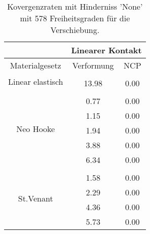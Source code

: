 \begin{table} 
\centering 
\begin{tabular}{c|cc|} 
\cline{2-3} 
 & \multicolumn{2}{|c|}{Linearer Kontakt} \\ 
\hline 
\multicolumn{1}{|c|}{Materialgesetz} & \multicolumn{1}{c|}{Verformung} & \multicolumn{1}{c|}{NCP} \\ 
\hline 
\multicolumn{1}{|c|}{\multirow{2}{*}{Linear elastisch}} &\multicolumn{1}{|c|}{} & \multicolumn{1}{|c|}{} \\ 
\multicolumn{1}{|c|}{} & \multicolumn{1}{|c|}{     13.98} & \multicolumn{1}{|c|}{      0.00} \\ 
\hline 
\multicolumn{1}{|c|}{\multirow{6}{*}{Neo Hooke}} &\multicolumn{1}{|c|}{} & \multicolumn{1}{|c|}{} \\ 
\multicolumn{1}{|c|}{} & \multicolumn{1}{|c|}{      0.77} & \multicolumn{1}{|c|}{      0.00} \\ 
\multicolumn{1}{|c|}{} & \multicolumn{1}{|c|}{      1.15} & \multicolumn{1}{|c|}{      0.00} \\ 
\multicolumn{1}{|c|}{} & \multicolumn{1}{|c|}{      1.94} & \multicolumn{1}{|c|}{      0.00} \\ 
\multicolumn{1}{|c|}{} & \multicolumn{1}{|c|}{      3.88} & \multicolumn{1}{|c|}{      0.00} \\ 
\multicolumn{1}{|c|}{} & \multicolumn{1}{|c|}{      6.34} & \multicolumn{1}{|c|}{      0.00} \\ 
\hline 
\multicolumn{1}{|c|}{\multirow{5}{*}{St.Venant}} &\multicolumn{1}{|c|}{} & \multicolumn{1}{|c|}{} \\ 
\multicolumn{1}{|c|}{} & \multicolumn{1}{|c|}{      1.58} & \multicolumn{1}{|c|}{      0.00} \\ 
\multicolumn{1}{|c|}{} & \multicolumn{1}{|c|}{      2.29} & \multicolumn{1}{|c|}{      0.00} \\ 
\multicolumn{1}{|c|}{} & \multicolumn{1}{|c|}{      4.36} & \multicolumn{1}{|c|}{      0.00} \\ 
\multicolumn{1}{|c|}{} & \multicolumn{1}{|c|}{      5.73} & \multicolumn{1}{|c|}{      0.00} \\ 
\hline 
\end{tabular}\caption{Kovergenzraten mit Hinderniss 'None' mit 578 Freiheitsgraden für die Verschiebung.}\label{tab:Rate_None_level3}
\end{table} 
